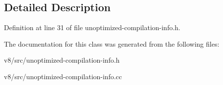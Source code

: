 \subsection{Detailed Description}


Definition at line 31 of file unoptimized-\/compilation-\/info.\+h.



The documentation for this class was generated from the following files\+:\begin{DoxyCompactItemize}
\item 
v8/src/unoptimized-\/compilation-\/info.\+h\item 
v8/src/unoptimized-\/compilation-\/info.\+cc\end{DoxyCompactItemize}
